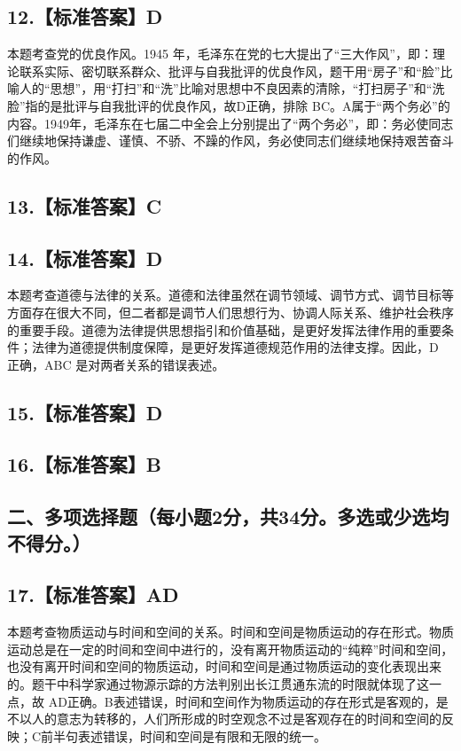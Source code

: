 \documentclass[UTF8,11pt]{ctexart}
\begin{document}
\subsection*{12.【标准答案】D}

本题考查党的优良作风。1945 年，毛泽东在党的七大提出了“三大作风”，即：理论联系实际、密切联系群众、批评与自我批评的优良作风，题干用“房子”和“脸”比喻人的“思想”，用“打扫”和“洗”比喻对思想中不良因素的清除，“打扫房子”和“洗脸”指的是批评与自我批评的优良作风，故D正确，排除 BC。A属于“两个务必”的内容。1949年，毛泽东在七届二中全会上分别提出了“两个务必”，即：务必使同志们继续地保持谦虚、谨慎、不骄、不躁的作风，务必使同志们继续地保持艰苦奋斗的作风。


\subsection*{13.【标准答案】C}

\subsection*{14.【标准答案】D}

本题考查道德与法律的关系。道德和法律虽然在调节领域、调节方式、调节目标等方面存在很大不同，但二者都是调节人们思想行为、协调人际关系、维护社会秩序的重要手段。道德为法律提供思想指引和价值基础，是更好发挥法律作用的重要条件；法律为道德提供制度保障，是更好发挥道德规范作用的法律支撑。因此，D 正确，ABC 是对两者关系的错误表述。


\subsection*{15.【标准答案】D}

\subsection*{16.【标准答案】B}

\subsection*{二、多项选择题（每小题2分，共34分。多选或少选均不得分。）}

\subsection*{17.【标准答案】AD}

本题考查物质运动与时间和空间的关系。时间和空间是物质运动的存在形式。物质运动总是在一定的时间和空间中进行的，没有离开物质运动的“纯粹”时间和空间，也没有离开时间和空间的物质运动，时间和空间是通过物质运动的变化表现出来的。题干中科学家通过物源示踪的方法判别出长江贯通东流的时限就体现了这一点，故 AD正确。B表述错误，时间和空间作为物质运动的存在形式是客观的，是不以人的意志为转移的，人们所形成的时空观念不过是客观存在的时间和空间的反映；C前半句表述错误，时间和空间是有限和无限的统一。
\end{document}
